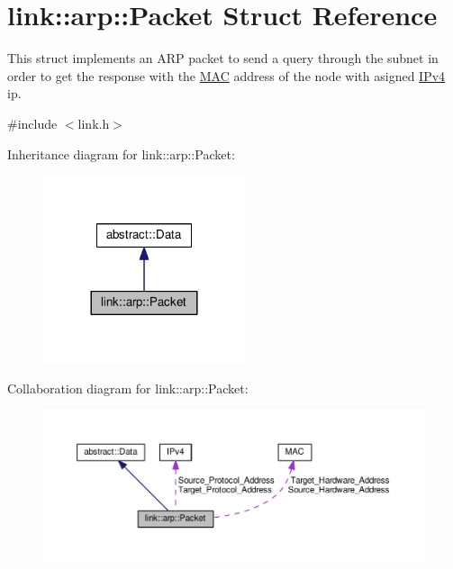 \hypertarget{structlink_1_1arp_1_1Packet}{}\section{link\+:\+:arp\+:\+:Packet Struct Reference}
\label{structlink_1_1arp_1_1Packet}


This struct implements an A\+RP packet to send a query through the subnet in order to get the response with the \hyperlink{structMAC}{M\+AC} address of the node with asigned \hyperlink{structIPv4}{I\+Pv4} ip.  




{\ttfamily \#include $<$link.\+h$>$}



Inheritance diagram for link\+:\+:arp\+:\+:Packet\+:\nopagebreak
\begin{figure}[H]
\begin{center}
\leavevmode
\includegraphics[width=168pt]{structlink_1_1arp_1_1Packet__inherit__graph}
\end{center}
\end{figure}


Collaboration diagram for link\+:\+:arp\+:\+:Packet\+:\nopagebreak
\begin{figure}[H]
\begin{center}
\leavevmode
\includegraphics[width=350pt]{structlink_1_1arp_1_1Packet__coll__graph}
\end{center}
\end{figure}
